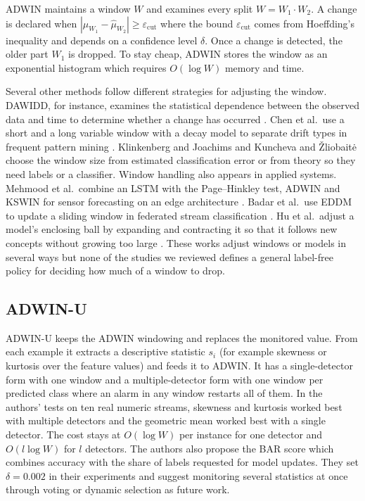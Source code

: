 \documentclass[conference]{IEEEtran}
\begin{document}
ADWIN \cite{bifet2007} maintains a window $W$ and examines every split $W=W_1\cdot W_2$. A change is declared when $|\hat\mu_{W_1}-\hat\mu_{W_2}|\ge\varepsilon_{\mathrm{cut}}$ where the bound $\varepsilon_{\mathrm{cut}}$ comes from Hoeffding's inequality \cite{hoeffding1963} and depends on a confidence level $\delta$. Once a change is detected, the older part $W_1$ is dropped. To stay cheap, ADWIN stores the window as an exponential histogram \cite{datar2002} which requires $O(\log W)$ memory and time.

Several other methods follow different strategies for adjusting the window. DAWIDD, for instance, examines the statistical dependence between the observed data and time to determine whether a change has occurred \cite{hinder2020}. Chen et al.\ use a short and a long variable window with a decay model to separate drift types in frequent pattern mining \cite{chen2024}. Klinkenberg and Joachims \cite{klinkenberg2000} and Kuncheva and \v{Z}liobait\.{e} \cite{kuncheva2009} choose the window size from estimated classification error or from theory so they need labels or a classifier. Window handling also appears in applied systems. Mehmood et al.\ combine an LSTM with the Page--Hinkley test, ADWIN and KSWIN for sensor forecasting on an edge architecture \cite{mehmood2024}. Badar et al.\ use EDDM to update a sliding window in federated stream classification \cite{badar2023}. Hu et al.\ adjust a model's enclosing ball by expanding and contracting it so that it follows new concepts without growing too large \cite{hu2024}. These works adjust windows or models in several ways but none of the studies we reviewed defines a general label-free policy for deciding how much of a window to drop.

\subsection{ADWIN-U}

ADWIN-U \cite{assis2025} keeps the ADWIN windowing and replaces the monitored value. From each example it extracts a descriptive statistic $s_i$ (for example skewness or kurtosis over the feature values) and feeds it to ADWIN. It has a single-detector form with one window and a multiple-detector form with one window per predicted class where an alarm in any window restarts all of them. In the authors' tests on ten real numeric streams, skewness and kurtosis worked best with multiple detectors and the geometric mean worked best with a single detector. The cost stays at $O(\log W)$ per instance for one detector and $O(l\log W)$ for $l$ detectors. The authors also propose the BAR score which combines accuracy with the share of labels requested for model updates. They set $\delta=0.002$ in their experiments and suggest monitoring several statistics at once through voting or dynamic selection as future work.
\end{document}
